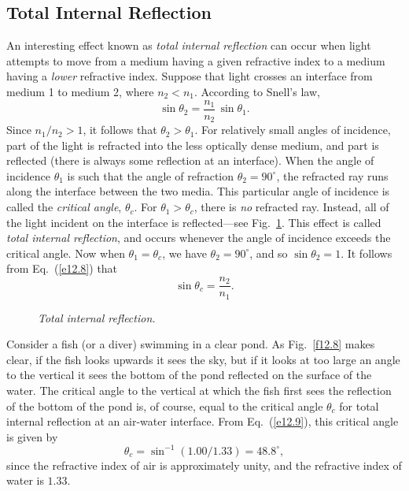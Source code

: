 \subsection{Total Internal Reflection}
An interesting effect known as {\em total internal reflection}\/
can occur when light attempts to move from a medium having a
given refractive index  to a medium having a {\em lower} refractive index.
Suppose that light crosses an interface from medium 1 to medium 2,
where $n_2< n_1$. According to Snell's law,
\begin{equation}\label{e12.8}
\sin\theta_2 = \frac{n_1}{n_2} \,\sin\theta_1.
\end{equation}
Since $n_1/n_2>1$, it follows that $\theta_2 > \theta_1$. 
For relatively small angles of incidence, part of the light
is refracted into the less optically dense medium, and part
is reflected (there is always some reflection at an interface). 
When the angle of incidence $\theta_1$ is such that the
angle of refraction $\theta_2= 90^\circ$, the refracted ray
runs along the interface between the two media. This particular
angle of incidence is called the {\em critical angle}, $\theta_c$. 
For $\theta_1>\theta_c$, there is {\em no}\/ refracted ray. Instead, all of
the light incident on the interface is reflected---see Fig.~\ref{f12.7}. This effect
is called {\em total internal reflection}, and occurs whenever the
angle of incidence exceeds the critical angle. 
Now when $\theta_1=\theta_c$, we have $\theta_2=90^\circ$, and so
$\sin\theta_2 = 1$. It follows from Eq.~(\ref{e12.8}) that
\begin{equation}\label{e12.9}
\sin\theta_c = \frac{n_2}{n_1}.
\end{equation}

\begin{figure}
\epsfysize=3.5in
\centerline{}
\caption{\em Total internal reflection.}\label{f12.7}
\end{figure}

Consider a fish (or a diver) swimming in a  clear 
pond. As Fig.~\ref{f12.8}
makes clear, if the fish looks upwards it sees the sky, but if
it looks at too large an angle to the vertical it sees the bottom
of the pond reflected on the surface of the water. The critical angle
to the vertical at which the fish first sees the reflection of
the bottom of the pond is, of course, equal to the critical angle
$\theta_c$ for total internal reflection at an air-water interface.
From Eq.~(\ref{e12.9}), this critical angle is given by
\begin{equation}
\theta_c = \sin^{-1}(1.00/1.33) = 48.8^\circ,
\end{equation}
since the refractive index of air is approximately unity, and
the refractive index of water is $1.33$. 

